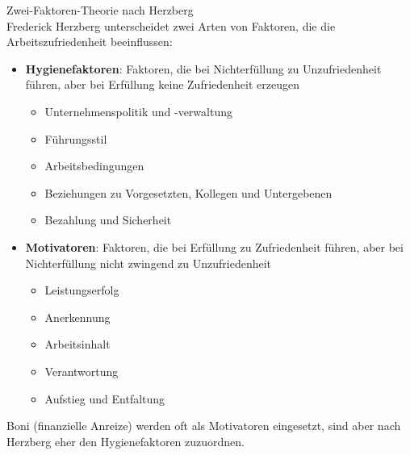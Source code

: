 \begin{concept}{Zwei-Faktoren-Theorie nach Herzberg}\\
Frederick Herzberg unterscheidet zwei Arten von Faktoren, die die Arbeitszufriedenheit beeinflussen:
\begin{itemize}
    \item \textbf{Hygienefaktoren}: Faktoren, die bei Nichterfüllung zu Unzufriedenheit führen, aber bei Erfüllung keine Zufriedenheit erzeugen
    \begin{itemize}
        \item Unternehmenspolitik und -verwaltung
        \item Führungsstil
        \item Arbeitsbedingungen
        \item Beziehungen zu Vorgesetzten, Kollegen und Untergebenen
        \item Bezahlung und Sicherheit
    \end{itemize}
    \item \textbf{Motivatoren}: Faktoren, die bei Erfüllung zu Zufriedenheit führen, aber bei Nichterfüllung nicht zwingend zu Unzufriedenheit
    \begin{itemize}
        \item Leistungserfolg
        \item Anerkennung
        \item Arbeitsinhalt
        \item Verantwortung
        \item Aufstieg und Entfaltung
    \end{itemize}
\end{itemize}

Boni (finanzielle Anreize) werden oft als Motivatoren eingesetzt, sind aber nach Herzberg eher den Hygienefaktoren zuzuordnen.
\end{concept}

